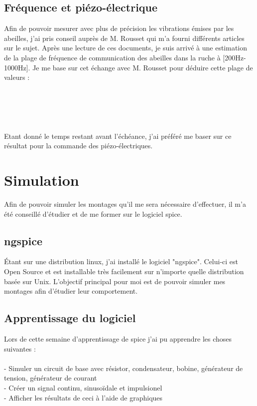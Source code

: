 \documentclass[11pt,french,a4paper]{article}
\begin{document}
\subsection{Fréquence et piézo-électrique}
Afin de pouvoir mesurer avec plus de précision les vibrations émises par les abeilles, j'ai pris conseil auprès de M. Rousset qui m'a fourni différents articles sur le sujet.
Après une lecture de ces documents, je suis arrivé à une estimation de la plage de fréquence de communication des abeilles dans la ruche à [200Hz-1000Hz]. Je me base sur cet échange avec M. Rousset pour déduire cette plage de valeurs : \\ 
\\
\\
\\ \\ \\Etant donné le temps restant avant l'échéance, j'ai préféré me baser sur ce résultat pour la commande des piézo-électriques.

\newpage
\section{Simulation}
Afin de pouvoir simuler les montages qu'il me sera nécessaire d'effectuer, il m'a été conseillé d'étudier et de me former sur le logiciel spice.

\subsection{ngspice}
Étant sur une distribution linux, j'ai installé le logiciel "ngspice". Celui-ci est Open Source et est installable très facilement sur n'importe quelle distribution basée sur Unix. L'objectif principal pour moi est de pouvoir simuler mes montages afin d'étudier leur comportement. 

\subsection{Apprentissage du logiciel}
Lors de cette semaine d'apprentissage de spice j'ai pu apprendre les choses suivantes :
\\
\\
- Simuler un circuit de base avec résistor, condensateur, bobine, générateur de tension, générateur de courant\\
- Créer un signal continu, sinusoïdale et impulsionel \\
- Afficher les résultats de ceci à l'aide de graphiques \\
\end{document}
